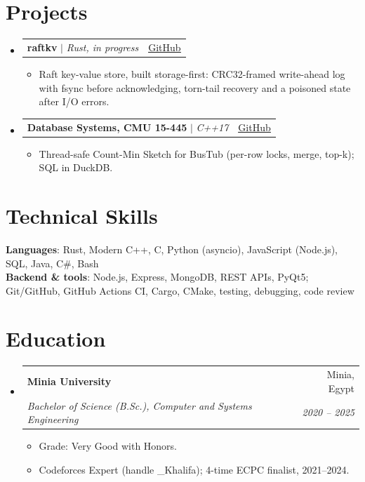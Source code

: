 \documentclass[letterpaper,11pt]{article}
\makeatletter
\newcommand{\resumeItem}[1]{
  \item\small{
    {#1 \vspace{-2pt}}
  }
}
\newcommand{\resumeSubheading}[4]{
  \vspace{-2pt}\item
    \begin{tabular*}{0.97\textwidth}[t]{l@{\extracolsep{\fill}}r}
      \textbf{#1} & #2 \\
      \textit{\small#3} & \textit{\small #4} \\
    \end{tabular*}\vspace{-7pt}
}
\newcommand{\resumeProjectHeading}[2]{
    \item
    \begin{tabular*}{0.97\textwidth}{l@{\extracolsep{\fill}}r}
      \small#1 & #2 \\
    \end{tabular*}\vspace{-7pt}
}
\newcommand{\resumeSubHeadingListStart}{\begin{itemize}[leftmargin=0.15in, label={}]}
\newcommand{\resumeSubHeadingListEnd}{\end{itemize}}
\newcommand{\resumeItemListStart}{\begin{itemize}}
\newcommand{\resumeItemListEnd}{\end{itemize}\vspace{-5pt}}
\newcommand{\cvlink}[2]{\href{#1}{\underline{#2}}}
\makeatother
\begin{document}
\section{Projects}
    \resumeSubHeadingListStart
      \resumeProjectHeading
          {\textbf{raftkv} $|$ \emph{Rust, in progress}}{\cvlink{https://github.com/Abd002/raftkv}{GitHub}}
          \resumeItemListStart
            \resumeItem{Raft key-value store, built storage-first: CRC32-framed write-ahead log with fsync before acknowledging, torn-tail recovery and a poisoned state after I/O errors.}
          \resumeItemListEnd
      \resumeProjectHeading
          {\textbf{Database Systems, CMU 15-445} $|$ \emph{C++17}}{\cvlink{https://github.com/Abd002/db-systems-journey}{GitHub}}
          \resumeItemListStart
            \resumeItem{Thread-safe Count-Min Sketch for BusTub (per-row locks, merge, top-k); SQL in DuckDB.}
          \resumeItemListEnd
    \resumeSubHeadingListEnd

%
\section{Technical Skills}
 \begin{itemize}[leftmargin=0.15in, label={}]
    \small{\item{
     \textbf{Languages}{: Rust, Modern C++, C, Python (asyncio), JavaScript (Node.js), SQL, Java, C\#, Bash} \\
     \textbf{Backend \& tools}{: Node.js, Express, MongoDB, REST APIs, PyQt5; Git/GitHub, GitHub Actions CI, Cargo, CMake, testing, debugging, code review}
    }}
 \end{itemize}

\section{Education}
  \resumeSubHeadingListStart
    \resumeSubheading
      {Minia University}{Minia, Egypt}
      {Bachelor of Science (B.Sc.), Computer and Systems Engineering}{2020 -- 2025}
      \resumeItemListStart
        \resumeItem{Grade: Very Good with Honors.}
        \resumeItem{Codeforces Expert (handle \_Khalifa); 4-time ECPC finalist, 2021--2024.}
      \resumeItemListEnd
  \resumeSubHeadingListEnd


\end{document}
